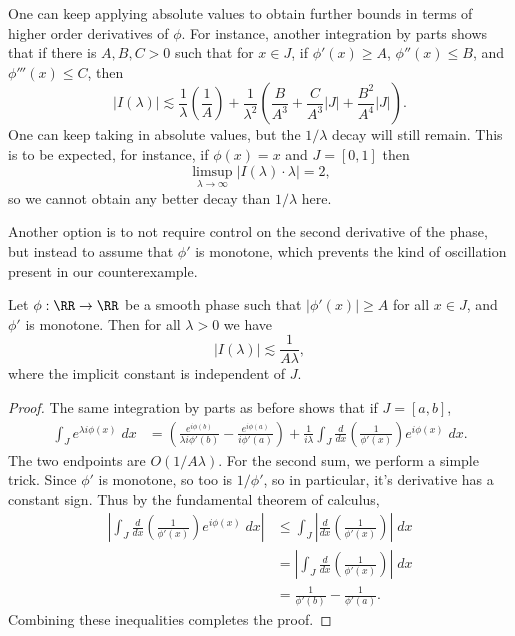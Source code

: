 One can keep applying absolute values to obtain further bounds in terms of higher order derivatives of $\phi$. For instance, another integration by parts shows that if there is $A,B,C > 0$ such that for $x \in J$, if $\phi'(x) \geq A$, $\phi''(x) \leq B$, and $\phi'''(x) \leq C$, then
%
\[ |I(\lambda)| \lesssim \frac{1}{\lambda} \left( \frac{1}{A} \right) + \frac{1}{\lambda^2} \left( \frac{B}{A^3} + \frac{C}{A^3} |J| + \frac{B^2}{A^4} |J| \right). \]
%
One can keep taking in absolute values, but the $1/\lambda$ decay will still remain. This is to be expected, for instance, if $\phi(x) = x$ and $J = [0,1]$ then
%
\[ \limsup_{\lambda \to \infty} |I(\lambda) \cdot \lambda| = 2, \]
%
so we cannot obtain any better decay than $1/\lambda$ here.

Another option is to not require control on the second derivative of the phase, but instead to assume that $\phi'$ is monotone, which prevents the kind of oscillation present in our counterexample.

\begin{lemma}
  Let $\phi: \RR \to \RR$ be a smooth phase such that $|\phi'(x)| \geq A$ for all $x \in J$, and $\phi'$ is monotone. Then for all $\lambda > 0$ we have
  \[ |I(\lambda)| \lesssim \frac{1}{A \lambda}, \]
  where the implicit constant is independent of $J$.
\end{lemma}
\begin{proof}
  The same integration by parts as before shows that if $J = [a,b]$,
  \begin{align*}
    \int_J e^{\lambda i \phi(x)}\; dx &= \left( \frac{e^{i \phi(b)}}{\lambda i \phi'(b)} - \frac{e^{i \phi(a)}}{i \phi'(a)} \right) + \frac{1}{i\lambda} \int_J \frac{d}{dx} \left( \frac{1}{\phi'(x)} \right) e^{i \phi(x)}\; dx.
  \end{align*}
  The two endpoints are $O(1/A \lambda)$. For the second sum, we perform a simple trick. Since $\phi'$ is monotone, so too is $1/\phi'$, so in particular, it's derivative has a constant sign. Thus by the fundamental theorem of calculus,
  \begin{align*}
    \left| \int_J \frac{d}{dx} \left( \frac{1}{\phi'(x)} \right) e^{i \phi(x)}\; dx \right| &\leq \int_J \left| \frac{d}{dx} \left( \frac{1}{\phi'(x)} \right)  \right|\; dx\\
    &= \left| \int_J \frac{d}{dx} \left( \frac{1}{\phi'(x)} \right) \right|\; dx\\
    &= \frac{1}{\phi'(b)} - \frac{1}{\phi'(a)}.
  \end{align*}
  Combining these inequalities completes the proof.
\end{proof}

